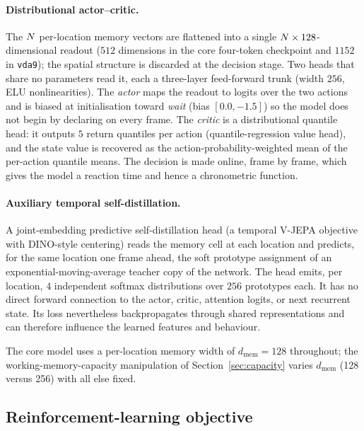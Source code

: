 \paragraph{Distributional actor--critic.}
The $N$ per-location memory vectors are flattened into a single
$N \times 128$-dimensional readout ($512$ dimensions in the core
four-token checkpoint and $1152$ in \texttt{vda9}); the spatial structure is
discarded at the decision stage. Two heads that share no parameters read
it, each a three-layer feed-forward trunk (width $256$, ELU
nonlinearities). The \emph{actor} maps the readout to logits over the two
actions and is biased at initialisation toward \emph{wait}
(bias $[0.0, -1.5]$) so the model does not begin by declaring on every
frame. The \emph{critic} is a distributional quantile head: it outputs
$5$ return quantiles per action (quantile-regression value head), and the
state value is recovered as the action-probability-weighted mean of the
per-action quantile means. The decision is made online, frame by frame,
which gives the model a reaction time and hence a chronometric function.

\paragraph{Auxiliary temporal self-distillation.}
A joint-embedding predictive self-distillation head (a temporal V-JEPA
objective with DINO-style centering) reads the memory cell at each
location and predicts, for the same location one frame ahead, the soft
prototype assignment of an exponential-moving-average teacher copy of the
network. The head emits, per location, $4$ independent softmax
distributions over $256$ prototypes each. It has no direct forward connection to the actor, critic, attention logits,
or next recurrent state. Its loss nevertheless backpropagates through shared
representations and can therefore influence the learned features and behaviour.

The core model uses a per-location memory width of $d_{\mathrm{mem}} = 128$
throughout; the working-memory-capacity manipulation of
Section~\ref{sec:capacity} varies $d_{\mathrm{mem}}$ (128 versus 256) with
all else fixed.

\subsection{Reinforcement-learning objective}
\label{sec:methods-training}

